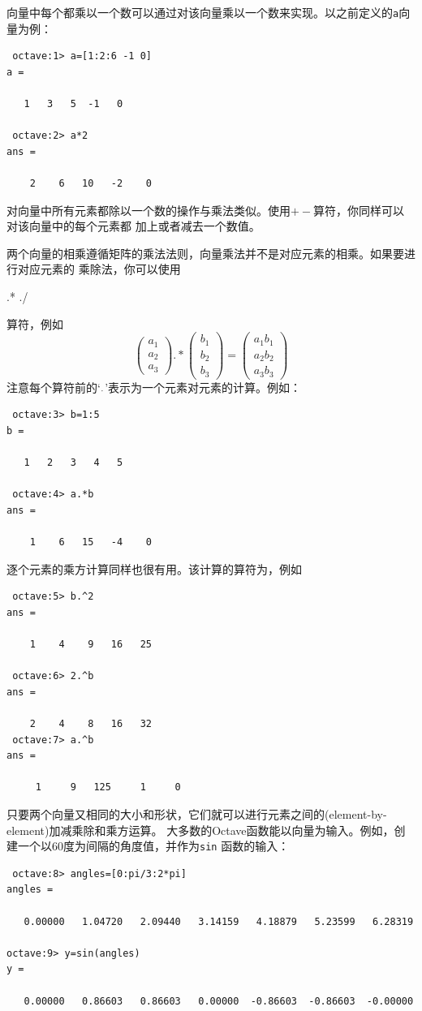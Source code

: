 \documentclass[UTF8,adobefonts]{ctexart}
\begin{document}
向量中每个都乘以一个数可以通过对该向量乘以一个数来实现。以之前定义的{\tt a}向量为例：
\begin{verbatim}
 octave:1> a=[1:2:6 -1 0]
a =

   1   3   5  -1   0

 octave:2> a*2
ans =

    2    6   10   -2    0

\end{verbatim}
对向量中所有元素都除以一个数的操作与乘法类似。使用$+-$算符，你同样可以对该向量中的每个元素都
加上或者减去一个数值。

两个向量的相乘遵循矩阵的乘法法则，向量乘法并不是对应元素的相乘。如果要进行对应元素的
乘除法，你可以使用\begin{verb}.* ./\end{verb}算符，例如
\begin{equation}
\begin{pmatrix}a_1\\a_2\\a_3\end{pmatrix}.* \begin{pmatrix}b_1\\b_2\\b_3\end{pmatrix}
=\begin{pmatrix}a_1b_1\\a_2b_2\\a_3b_3\end{pmatrix}
\end{equation}
注意每个算符前的‘$\ldotp$’表示为一个元素对元素的计算。例如：
\begin{verbatim}
 octave:3> b=1:5
b =

   1   2   3   4   5

 octave:4> a.*b
ans =

    1    6   15   -4    0

\end{verbatim}
逐个元素的乘方计算同样也很有用。该计算的算符为，例如
\begin{verbatim}
 octave:5> b.^2
ans =

    1    4    9   16   25

 octave:6> 2.^b
ans =

    2    4    8   16   32
 octave:7> a.^b
ans =

     1     9   125     1     0
\end{verbatim}
只要两个向量又相同的大小和形状，它们就可以进行元素之间的(element-by-element)加减乘除和乘方运算。
大多数的Octave函数能以向量为输入。例如，创建一个以60度为间隔的角度值，并作为{\tt sin}
函数的输入：
\begin{verbatim}
 octave:8> angles=[0:pi/3:2*pi]
angles =

   0.00000   1.04720   2.09440   3.14159   4.18879   5.23599   6.28319

octave:9> y=sin(angles)
y =

   0.00000   0.86603   0.86603   0.00000  -0.86603  -0.86603  -0.00000

\end{verbatim}
\end{document}
